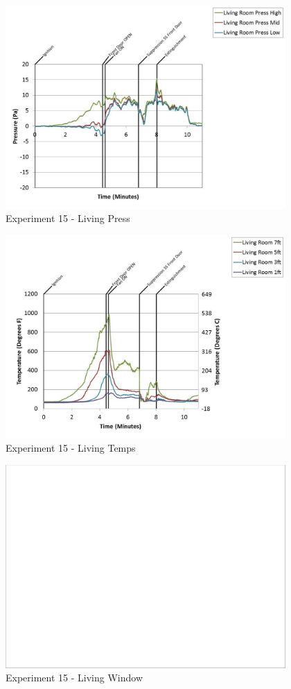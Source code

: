 \documentclass{article}
\begin{document}
\begin{appendices}
	\begin{figure}[h!]
		\centering
		\includegraphics[height=3.05in]{0_Images/Results_Charts/Exp_15_Charts/LivingPress.pdf}
		\caption{Experiment 15 - Living Press}
	\end{figure}
 
	\clearpage

	\begin{figure}[h!]
		\centering
		\includegraphics[height=3.05in]{0_Images/Results_Charts/Exp_15_Charts/LivingTemps.pdf}
		\caption{Experiment 15 - Living Temps}
	\end{figure}
 

	\begin{figure}[h!]
		\centering
		\includegraphics[height=3.05in]{0_Images/Results_Charts/Exp_15_Charts/LivingWindow.pdf}
		\caption{Experiment 15 - Living Window}
	\end{figure}
 

\end{appendices}
\end{document}
